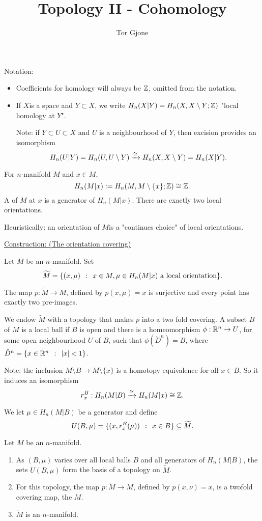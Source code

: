 \documentclass[a4paper,11pt,english]{article}
\title{\textbf{Topology II - Cohomology}}
\author{Tor Gjone}
\def\tM{\widetilde{M}}
\def\oD{\mathring{D}}
\begin{document}
\mmaketitle


Notation: 
\begin{itemize}
\item Coefficients for homology will always be $\mathbb{Z}$, omitted from the notation.
\item If $X$is a space and $Y\subset X$, we write $H_n(X|Y) = H_n(X,X\setminus
Y; \mathbb{Z})$ "local homology at $Y$".

Note: if $Y \subset U \subset X$ and $U$ is a neighbourhood of $Y$, then
excision provides an isomorphism 
\[ H_n(U|Y) = H_n(U,U\setminus Y) \xrightarrow{\cong} H_n(X,X\setminus Y) = H_n(X|Y). \]
\end{itemize}

For $n$-manifold $M$ and $x\in M$, 
\[ H_n(M|x) := H_n(M,M\setminus \{x\}; \mathbb{Z}) \cong \mathbb{Z}. \]
A  of $M$ at $x$ is a generator of $H_n(M|x)$. There
are exactly two local orientations.

Heuristically:  an orientation of $M$is a "continues choice" of local
orientations.

\underline{Construction: (The orientation covering)}

Let $M$ be an $n$-manifold. Set
\[ \tM = \{ (x,\mu) \q: x \in M, \mu\in H_n(M|x) \text{ a local
orientation} \}. \]

The map $p : \tM \to M$, defined by $p(x,\mu) = x$ is surjective and every
point has exactly two pre-images.

We endow $\tM$ with a topology that makes $p$ into a two fold covering.
A subset $B$ of $M$ is a local ball if $B$ is open and there is a homeomorphism
$\phi : \mathbb{R}^n \to U$, for some open neighbourhood $U$ of $B$, such that
$\phi(\oD^n) = B$, where $\oD^n = \{ x\in\R^n \q: |x| < 1 \}$.


Note: the inclusion $M\setminus B \to M\setminus \{ x \}$ is a homotopy
equivalence for all $x\in B$. So it induces an isomorphism 
\[ r^B_x : H_n(M|B) \xrightarrow{\cong} H_n(M|x) \cong \mathbb{Z}. \]

We let $\mu \in H_n(M|B)$ be a generator and define
\[ U(B,\mu) = \{ (x,r^B_x(\mu)) \q: x\in B \} \subseteq \tM. \]

\begin{thrm}
Let $M$ be an $n$-manifold.
\begin{enumerate}
\item As $(B,\mu)$ varies over all local balls $B$ and all generators of
$H_n(M|B)$, the sets $U(B,\mu)$ form the basis of a topology on $\tM$.

\item For this topology, the map $p: \tM \to M$, defined by $p(x,\nu) = x$, is a
twofold covering map, the  $M$.

\item $\tM$ is an $n$-manifold.
\end{enumerate}
\end{thrm}
\end{document}
